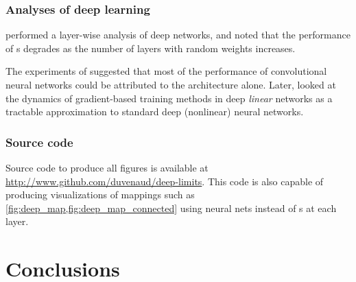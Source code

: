 \subsubsection{Analyses of deep learning}
\citet{montavon2010layer} performed a layer-wise analysis of deep networks, and noted that the performance of \MLP{}s degrades as the number of layers with random weights increases.

The experiments of \citet{saxe2011random} suggested that most of the performance of convolutional neural networks could be attributed to the architecture alone.
Later, \citet{saxedynamics} looked at the dynamics of gradient-based training methods in deep \emph{linear} networks as a tractable approximation to standard deep (nonlinear) neural networks.  








\subsubsection{Source code}
Source code to produce all figures is available at \url{http://www.github.com/duvenaud/deep-limits}.
This code is also capable of producing visualizations of mappings such as \cref{fig:deep_map,fig:deep_map_connected} using neural nets instead of \gp{}s at each layer.


\section{Conclusions}


